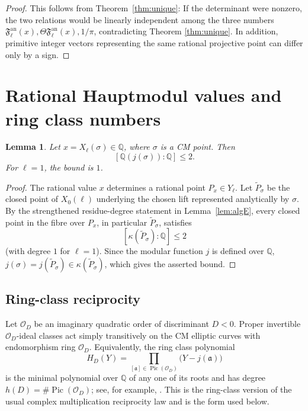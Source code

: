 \documentclass[11pt,a4paper]{amsart} %
\newtheorem{lemma}[theorem]{Lemma}
\theoremstyle{definition}
\newcommand{\Q}{\mathbb Q}
\newcommand{\Pic}{\operatorname{Pic}}
\begin{document}
\begin{proof}
This follows from Theorem~\ref{thm:unique}: If the determinant were nonzero, the two relations would be linearly independent among the three numbers \({\mathfrak F}^{\text{an}}_\ell(x),\Theta {\mathfrak F}^{\text{an}}_\ell(x),1/\pi\), contradicting Theorem \ref{thm:unique}. In addition, primitive integer vectors representing the same rational projective point can differ only by a sign.
\end{proof}

\section{Rational Hauptmodul values and ring class numbers}

\begin{lemma}\label{lem:jdegree}
Let \(x=X_\ell(\sigma)\in\Q\), where \(\sigma\) is a CM point. Then
\[
[\Q(j(\sigma)):\Q]\le2.
\]
For \(\ell=1\), the bound is \(1\).
\end{lemma}

\begin{proof}
The rational value \(x\) determines a rational point \(P_x\in Y_\ell\).
Let \(\widetilde P_\sigma\) be the closed point of \(X_0(\ell)\) underlying
the chosen lift represented analytically by \(\sigma\). By the strengthened
residue-degree statement in Lemma~\ref{lem:algE}, every closed point in the
fibre over \(P_x\), in particular \(\widetilde P_\sigma\), satisfies
\[
[\kappa(\widetilde P_\sigma):\Q]\le2
\]
(with degree \(1\) for \(\ell=1\)). Since the modular function \(j\) is
defined over \(\Q\),
\(j(\sigma)=j(\widetilde P_\sigma)\in\kappa(\widetilde P_\sigma)\), which
gives the asserted bound.
\end{proof}

\subsection*{Ring-class reciprocity}
Let $\mathcal O_D$ be an imaginary quadratic order of discriminant $D<0$.  Proper invertible $\mathcal O_D$-ideal classes act simply transitively on the CM elliptic curves with endomorphism ring $\mathcal O_D$.  Equivalently, the ring class polynomial
\[
H_D(Y)=\prod_{[\mathfrak a]\in\Pic(\mathcal O_D)}\bigl(Y-j(\mathfrak a)\bigr)
\]
is the minimal polynomial over $\Q$ of any one of its roots and has degree $h(D)=\#\Pic(\mathcal O_D)$; see, for example, \cite{Cox}.  This is the ring-class version of the usual complex multiplication reciprocity law and is the form used below.
\end{document}

